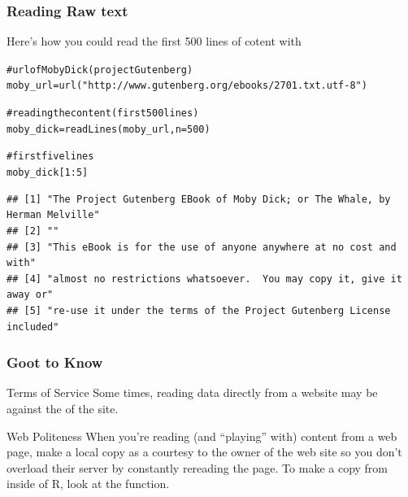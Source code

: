 \documentclass{beamer}\usepackage[]{graphicx}\usepackage[]{color}
\makeatletter
\newcommand{\hlnum}[1]{\textcolor[rgb]{0.063,0.58,0.627}{#1}}%
\newcommand{\hlstr}[1]{\textcolor[rgb]{0.063,0.58,0.627}{#1}}%
\newcommand{\hlcom}[1]{\textcolor[rgb]{0.588,0.588,0.588}{#1}}%
\newcommand{\hlopt}[1]{\textcolor[rgb]{0.196,0.196,0.196}{#1}}%
\newcommand{\hlstd}[1]{\textcolor[rgb]{0.196,0.196,0.196}{#1}}%
\newcommand{\hlkwb}[1]{\textcolor[rgb]{0.627,0,0.314}{#1}}%
\newcommand{\hlkwc}[1]{\textcolor[rgb]{0,0.631,0.314}{#1}}%
\newcommand{\hlkwd}[1]{\textcolor[rgb]{0.78,0.227,0.412}{#1}}%
\newenvironment{kframe}{%
 \def\at@end@of@kframe{}%
 \ifinner\ifhmode%
  \def\at@end@of@kframe{\end{minipage}}%
  \begin{minipage}{\columnwidth}%
 \fi\fi%
 \def\FrameCommand##1{\hskip\@totalleftmargin \hskip-\fboxsep
 \colorbox{shadecolor}{##1}\hskip-\fboxsep
     \hskip-\linewidth \hskip-\@totalleftmargin \hskip\columnwidth}%
 \MakeFramed {\advance\hsize-\width
   \@totalleftmargin\z@ \linewidth\hsize
   \@setminipage}}%
 {\par\unskip\endMakeFramed%
 \at@end@of@kframe}
\newenvironment{knitrout}{}{} %
\makeatother
\begin{document}
\begin{frame}[fragile]
\frametitle{Reading Raw text}

Here's how you could read the first 500 lines of cotent with 

\begin{knitrout}\tiny
{}\color{fgcolor}\begin{kframe}
\begin{alltt}
\hlcom{# url of Moby Dick (project Gutenberg)}
\hlstd{moby_url} \hlkwb{=} \hlkwd{url}\hlstd{(}\hlstr{"http://www.gutenberg.org/ebooks/2701.txt.utf-8"}\hlstd{)}

\hlcom{# reading the content (first 500 lines)}
\hlstd{moby_dick} \hlkwb{=} \hlkwd{readLines}\hlstd{(moby_url,} \hlkwc{n} \hlstd{=} \hlnum{500}\hlstd{)}
\end{alltt}
\end{kframe}
\end{knitrout}



\begin{knitrout}\tiny
{}\color{fgcolor}\begin{kframe}
\begin{alltt}
\hlcom{# first five lines}
\hlstd{moby_dick[}\hlnum{1}\hlopt{:}\hlnum{5}\hlstd{]}
\end{alltt}
\begin{verbatim}
## [1] "The Project Gutenberg EBook of Moby Dick; or The Whale, by Herman Melville"
## [2] ""                                                                          
## [3] "This eBook is for the use of anyone anywhere at no cost and with"          
## [4] "almost no restrictions whatsoever.  You may copy it, give it away or"      
## [5] "re-use it under the terms of the Project Gutenberg License included"
\end{verbatim}
\end{kframe}
\end{knitrout}

{\footnotesize {}}

\end{frame}


\begin{frame}[fragile]
\frametitle{Goot to Know}

\begin{block}{Terms of Service}
Some times, reading data directly from a website may be against the  of the site.
\end{block}

\begin{block}{Web Politeness}
When you're reading (and ``playing'' with) content from a web page, make a local copy as a courtesy to the owner of the web site so you don't overload their server by constantly rereading the page. To make a copy from inside of R, look at the  function. 
\end{block}

\end{frame}
\end{document}
